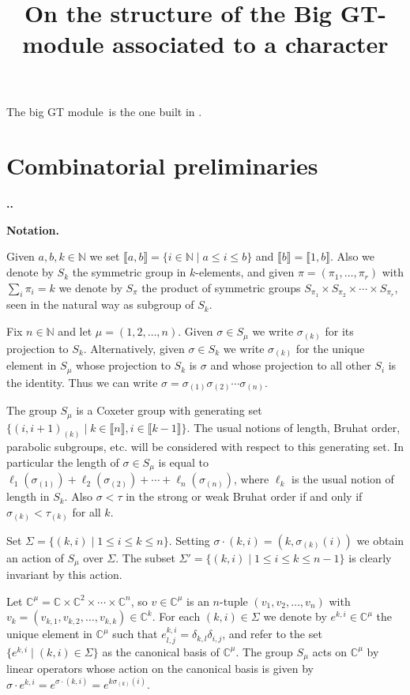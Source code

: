 \documentclass[11pt,fleqn]{amsart}
\title{On the structure of the Big GT-module associated to a character}
\date{}
\renewcommand\thesection{\arabic{section}}
\newcounter{para}[section]
\renewcommand\thepara{\thesection.\arabic{para}}
\def\paragraph{%
 \noindent
 \refstepcounter{para}%
 \textbf{\thepara.}\hspace{1ex}%
}
\newcommand\about[1]{%
 {\bfseries#1.}%
}
\newcommand\NN{\mathbb N}
\newcommand\CC{\mathbb C}
\newcommand\interval[1]{\llbracket #1 \rrbracket}
\newcommand\bigmodule{big GT module~}
\begin{document}
\maketitle
The \bigmodule is the one built in \cite{RZ18}.

\section{Combinatorial preliminaries}

\paragraph
\about{Notation}
\label{notation}
Given $a,b,k \in \NN$ we set $\interval{a,b} = \{i \in \NN \mid a \leq i \leq 
b\}$ and $\interval{b} = \interval{1,b}$. Also we denote by $S_k$ the 
symmetric group in $k$-elements, and given $\pi = (\pi_1, \ldots, \pi_r)$
with $\sum_i \pi_i = k$ we denote by $S_\pi$ the product of symmetric groups
$S_{\pi_1} \times S_{\pi_2} \times \cdots \times S_{\pi_r}$, seen in the 
natural way as subgroup of $S_k$.

Fix $n \in \NN$ and let $\mu = (1, 2, \ldots, n)$. Given $\sigma \in S_\mu$ we 
write $\sigma_{(k)}$ for its projection to $S_k$. Alternatively, given $\sigma 
\in S_k$ we write $\sigma_{(k)}$ for the unique element in $S_\mu$ whose 
projection to $S_k$ is $\sigma$ and whose projection to all other $S_i$ is the
identity. Thus we can write $\sigma = \sigma_{(1)} \sigma_{(2)} \cdots 
\sigma_{(n)}$.

The group $S_\mu$ is a Coxeter group with generating set $\{(i,i+1)_{(k)}
\mid k \in \interval{n}, i \in \interval{k-1}\}$. The usual notions of length,
Bruhat order, parabolic subgroups, etc. will be considered with respect to 
this generating set. In particular the length of $\sigma \in 
S_\mu$ is equal to $\ell_1(\sigma_{(1)}) + \ell_2(\sigma_{(2)}) + \cdots + 
\ell_n(\sigma_{(n)})$, where $\ell_k$ is the usual notion of length in $S_k$.
Also $\sigma < \tau$ in the strong or weak Bruhat order if and only if 
$\sigma_{(k)} < \tau_{(k)}$ for all $k$.

Set $\Sigma = \{(k,i) \mid 1 \leq i \leq k \leq n\}$. Setting $\sigma \cdot 
(k,i) = (k, \sigma_{(k)}(i))$ we obtain an action of $S_\mu$ over $\Sigma$.
The subset $\Sigma' = \{(k,i) \mid 1 \leq i \leq k \leq n-1\}$ is clearly 
invariant by this action.

Let $\CC^\mu = \CC \times \CC^2 \times \cdots \times \CC^n$, so $v \in \CC^\mu$
is an $n$-tuple $(v_1, v_2, \ldots, v_n)$ with $v_k = (v_{k,1}, v_{k,2},
\ldots, v_{k,k}) \in \CC^k$. For each $(k,i) \in \Sigma$ we denote by $e^{k,i}
\in \CC^\mu$ the unique element in $\CC^\mu$ such that $e^{k,i}_{l,j} = 
\delta_{k,l} \delta_{i,j}$, and refer to the set $\{e^{k,i}\mid (k,i) \in 
\Sigma\}$ as the canonical basis of $\CC^\mu$. The group $S_\mu$ acts on 
$\CC^\mu$ by linear operators whose action on the canonical basis is given by
$\sigma \cdot e^{k,i} = e^{\sigma \cdot (k,i)} = e^{k \sigma_{(k)}(i)}$.
\end{document}
